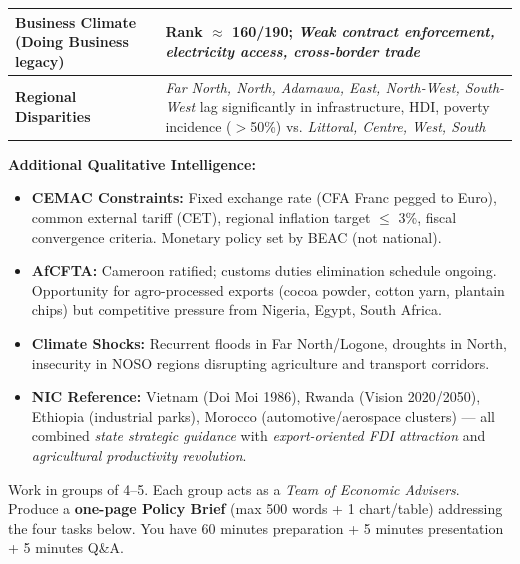 \documentclass[11pt]{article}
\newcounter{popsec}
\newcounter{popsub}
\newcommand{\courssub}[1]{%
  \stepcounter{popsub}%
  \par\vspace{9pt}\noindent{\popxbold\fontsize{11.5}{13}\selectfont\color{popink}{\color{poporange}\thepopsec.\thepopsub}\hspace{6pt}#1}\par\nopagebreak\vspace{4pt}
}
\begin{document}
\begin{center}
\begin{tabularx}{\linewidth}{|l|X|}
\textbf{Business Climate (Doing Business legacy)} & Rank $\approx$ 160/190; \emph{Weak contract enforcement, electricity access, cross-border trade} \\ \hline
\textbf{Regional Disparities} & \emph{Far North, North, Adamawa, East, North-West, South-West} lag significantly in infrastructure, HDI, poverty incidence ($>$50\%) vs. \emph{Littoral, Centre, West, South} \\ \hline
\end{tabularx}
\end{center}

\textbf{Additional Qualitative Intelligence:}
\begin{itemize}
    \item \textbf{CEMAC Constraints:} Fixed exchange rate (CFA Franc pegged to Euro), common external tariff (CET), regional inflation target $\le$ 3\%, fiscal convergence criteria. Monetary policy set by BEAC (not national).
    \item \textbf{AfCFTA:} Cameroon ratified; customs duties elimination schedule ongoing. Opportunity for agro-processed exports (cocoa powder, cotton yarn, plantain chips) but competitive pressure from Nigeria, Egypt, South Africa.
    \item \textbf{Climate Shocks:} Recurrent floods in Far North/Logone, droughts in North, insecurity in NOSO regions disrupting agriculture and transport corridors.
    \item \textbf{NIC Reference:} Vietnam (Doi Moi 1986), Rwanda (Vision 2020/2050), Ethiopia (industrial parks), Morocco (automotive/aerospace clusters) — all combined \emph{state strategic guidance} with \emph{export-oriented FDI attraction} and \emph{agricultural productivity revolution}.
\end{itemize}

\courssub{Tasks}
Work in groups of 4--5. Each group acts as a \emph{Team of Economic Advisers}. Produce a \textbf{one-page Policy Brief} (max 500 words + 1 chart/table) addressing the four tasks below. You have 60 minutes preparation + 5 minutes presentation + 5 minutes Q\&A.
\end{document}

